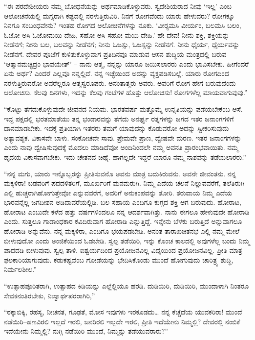  “ಈ ಪರದೇಶೀಯರು ನಮ್ಮ ಬೋಧನೆಯನ್ನು ಅರ್ಥಮಾಡಿಕೊಳ್ಳುವರು. ಸ್ವದೇಶಿಯರಾದ ನೀವು ‘ಇಲ್ಲ’ ಎಂಬ ಆಲೋಚನೆಯಲ್ಲಿ ಮಗ್ನರಾಗಿ ಕಷ್ಟದಲ್ಲಿ ನರಳುತ್ತಿರುವಿರಿ. ನಿನಗೆ ರೋಗವೆಂದು ಯಾರು ಹೇಳುವರು? ರೋಗಕ್ಕೂ ನಿನಗೂ ಸಂಬಂಧವೇನು? ಇಂತಹ ರೋಗದ ಅಲೋಚನೆಗಳನ್ನು ನೂಕು. ‘ವೀರ‍್ಯಮಸಿ ವೀರ್ಯಂ, ಬಲಮಸಿ ಬಲಂ, ಓಜೋ ಅಸಿ ಓಜೋಮಯಿ ದೇಹಿ, ಸಹೋ ಅಸಿ ಸಹೋ ಮಯಿ ದೇಹಿ.’ ಹೇ ದೇವ! ನೀನು ಶಕ್ತಿ, ಶಕ್ತಿಯನ್ನು ನೀಡೆನಗೆ; ನೀನು ಬಲ, ಬಲವನ್ನು ನೀಡೆನಗೆ; ನೀನು ಓಜಸ್ಸು, ಓಜಸ್ಸನ್ನು ನೀಡೆನಗೆ. ನೀನು ಧೈರ್ಯ, ಧೈರ್ಯವನ್ನು ನೀಡೆನಗೆ. ದೇವರ ಪೂಜೆಗೆ ಕುಳಿತುಕೊಳ್ಳುವಾಗ ಪ್ರತಿದಿನವೂ ಮಾಡುವ ಆಸನ ಶುದ್ಧಿಯ ಮಂತ್ರದಲ್ಲಿ ಬರುವ ‘ಆತ್ಮಾನಮಚ್ಛಿದ್ರಂ ಭಾವಯೇತ್’ – ನಾನು ಆತ್ಮ, ನನ್ನನ್ನು ಯಾರೂ ಜಯಿಸಲಾರರು ಎಂದು ಭಾವಿಸಬೇಕು. ಹೀಗೆಂದರೆ ಏನು ಅರ್ಥ? ಎಂದರೆ ಎಲ್ಲವೂ ನನ್ನಲ್ಲಿದೆ. ನನ್ನ ಇಚ್ಛೆಯಿಂದ ಅದನ್ನು ವ್ಯಕ್ತಪಡಿಸಬಲ್ಲೆ. ಯಾರು ರೋಗದಿಂದ ನರಳುತ್ತಿರುವರೋ ಅವರೆಲ್ಲರೂ ಆತ್ಮಸ್ವರೂಪರು. ಅನಂತಾತ್ಮರು ಅವರು. ಅವರಿಗೆ ರೋಗ ಹೇಗೆ ಬರುವುದೆಂದು ಆಲೋಚಿಸು. ಕೆಲವು ದಿನಗಳು, ಇದನ್ನು ಕೆಲವು ಗಂಟೆಗಳ ಹೊತ್ತು ಆಲೋಚಿಸು! ರೋಗಗಳೆಲ್ಲ ಮಾಯವಾಗುವುವು.” 

 “ಕೊಟ್ಟು ತೆಗೆದುಕೊಳ್ಳುವುದೇ ಜೀವನದ ನಿಯಮ. ಭಾರತವರ್ಷ ಮತ್ತೊಮ್ಮೆ ಉನ್ನತಿಯನ್ನು ಪಡೆಯಬೇಕೆಂಬ ಆಸೆ. ಇದ್ದ ಪಕ್ಷದಲ್ಲಿ ಭರತಮಾತೆಯು ತನ್ನ ಭಂಡಾರವನ್ನು ತೆಗೆದು ಅನರ್ಘ್ಯ ರತ್ನಗಳನ್ನು ಜಗದ ಇತರ ಜನಾಂಗಗಳಿಗೆ ದಾನಮಾಡಬೇಕು. ಇದಕ್ಕೆ ಪ್ರತಿಯಾಗಿ ಇತರರು ತಮಗೆ ಯಾವುದನ್ನು ಕೊಡುವರೋ ಅದನ್ನು ಸ್ವೀಕರಿಸುವುದು ಅತ್ಯಾವಶ್ಯಕ. ವಿಕಾಸವೇ ಬಾಳು. ಸಂಕೋಚವೇ ಸಾವು. ಪ್ರೇಮವೇ ಪ್ರಾಣ, ದ್ವೇಷವೇ ಮರಣ. ಇತರ ಜನಾಂಗಗಳನ್ನು ಎಂದು ನಾವು ದ್ವೇಷಿಸುವುದಕ್ಕೆ ಮೊದಲು ಮಾಡಿದೆವೋ ಅಂದಿನಿಂದಲೇ ನಮ್ಮ ಅವನತಿ ಪ್ರಾರಂಭವಾಯಿತು. ನಮ್ಮ ಹೃದಯ ವಿಕಾಸವಾಗಬೇಕು. ಇದು ಚೇತನದ ಚಿಹ್ನೆ. ಹಾಗಲ್ಲದೇ ಇದ್ದರೆ ಯಾರೂ ನಮ್ಮ ನಾಶವನ್ನು ತಡೆಯಲಾರರು.” 

 “ನನ್ನ ಮಗು, ಯಾರು ಇನ್ನೊಬ್ಬರನ್ನು ಪ್ರೀತಿಸುವನೊ ಅವನು ಮಾತ್ರ ಬದುಕಿರುವನು. ಅವನೇ ಜೀವಂತನು. ನನ್ನ ಮಕ್ಕಳಿರಾ!‌ ಬಡವರಿಗೆ ಪದದಳಿತರಿಗೆ, ಮೂರ್ಖರಿಗೆ ಮನಮರುಗಿ. ನಿಮ್ಮ ಎದೆಯ ಚಲನೆ ನಿಲ್ಲುವವರೆಗೆ, ತಲೆತಿರುಗಿ ಎಲ್ಲಿ ಹುಚ್ಚರಾಗಿಹೋಗುತ್ತೇವೋ ಎನ್ನುವವರೆಗೆ, ಅವರಿಗೆ ಅನುಕಂಪವನ್ನು ತೋರಿ. ತರುವಾಯ ನಿಮ್ಮ ಎದೆಯ ಭಾರವನ್ನೆಲ್ಲ ಜಗದೀಶನ ಅಡಿದಾವರೆಯಲ್ಲಿಡಿ. ಬಲ ಸಹಾಯ ಎಂದಿಗೂ ಕುಗ್ಗದ ಶಕ್ತಿ ಆಗ ಬರುವುದು. ಹೋರಾಟ, ಹೋರಾಟ ಎಂಬುದೇ ಕಳೆದ ಹತ್ತು ವರ್ಷಗಳಿಂದಲೂ ನನ್ನ ಆದರ್ಶವಾಗಿತ್ತು. ನಾನು ಈಗಲೂ ಹೇಳುವುದೇ ಹೋರಾಡಿ ಎಂದು. ಸುತ್ತಲೂ ಗಾಡಾಂಧಕಾರ ಕವಿದಿರುವಾಗ ಹೋರಾಡಿ ಎನ್ನುತ್ತಿದ್ದೆ. ಇನ್ನೇನು ಬೆಳಕು ಬರುತ್ತಿದೆ ಅನ್ನುವಾಗಲೂ ಹೋರಾಡಿ ಅನ್ನುವೆನು. ನನ್ನ ಮಕ್ಕಳಿರಾ, ಎಂದಿಗೂ ಭಯಪಡಬೇಡಿ. ಅನಂತ ತಾರಾಖಚಿತನಭ ಎಲ್ಲಿ ನಮ್ಮ ಮೇಲೆ ಬೀಳುವುದೋ ಎಂದು ಅಂಜಿಕೆಯಿಂದ ಓಡಬೇಡಿ. ಸ್ವಲ್ಪ ತಡೆಯಿರಿ, ಇನ್ನು ಕೊಂಚ ಕಾಲದಲ್ಲಿ ಅವುಗಳೆಲ್ಲ ಬಂದು ನಿಮ್ಮ ಪಾದದಡಿ ಬೀಳುವುವು. ಸ್ವಲ್ಪ ತಾಳಿ. ಐಶ್ವರ್ಯದಿಂದ ಪ್ರಯೋಜನವಿಲ್ಲ ವಿದ್ಯೆಯಿಂದ ಪ್ರಯೋಜನವಿಲ್ಲ. ಪ್ರೀತಿ ಮಾತ್ರ ಫಲಕಾರಿಯಾಗುವುದು. ಕಡುಕಷ್ಟವೆಂಬ ಗೋಡೆಯನ್ನು ಭೇದಿಸಿಕೊಂಡು ಮುಂದೆ ಹೋಗುವುದು ಚಾರಿತ್ರ್ಯ ಶುದ್ಧಿ, ನಿರ್ಮಲಶೀಲ.” 

 “ಉತ್ಸಾಹಪೂರಿತರಾಗಿ, ಉತ್ಸಾಹದ ಕಿಡಿಯನ್ನು ಎಲ್ಲೆಲ್ಲಿಯೂ ಹರಡಿ. ದುಡಿಯಿರಿ, ದುಡಿಯಿರಿ, ಮುಂದಾಳಾಗಿ ನಿಂತರೂ ಸೇವಕನಂತಿರಬೇಕು, ನಿಃಸ್ವಾರ್ಥಪರರಾಗಿರಿ,” 

 “ಠಕ್ಕಾಬಿಕ್ಕಿ, ರಹಸ್ಯ, ನೀಚನತ, ಗೂಢತೆ, ಮೋಸ ಇವುಗಳು ಇರಕೂಡದು… ನನ್ನ ಕೆಚ್ಚೆದೆಯ ಯುವಕರಿರಾ! ಮುಂದೆ ನಡೆಯಿರಿ–ಹಣವಿರಲಿ ಇಲ್ಲದೆ ಇರಲಿ, ಜನರಿರಲಿ ಇಲ್ಲದೇ ಇರಲಿ, ಪ್ರೀತಿ ಇದೆಯೇನು ನಿಮ್ಮಲ್ಲಿ? ದೇವರಲ್ಲಿ ನಂಬಿಕೆ ಇದೆಯೇನು ನಿಮ್ಮಲ್ಲಿ? ನುಗ್ಗಿ ನಡೆಯಿರಿ ಮುಂದೆ, ನಿಮ್ಮನ್ನು ತಡೆಯುವರಾರು?” 

